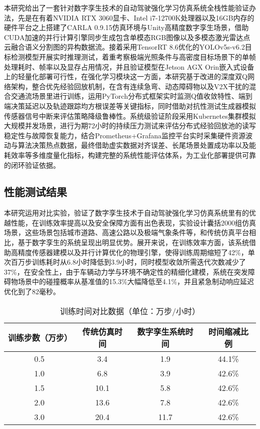 本研究给出了一套针对数字孪生技术的自动驾驶强化学习仿真系统全栈性能验证办法，先是在有着NVIDIA RTX 3060显卡、Intel i7-12700K处理器以及16GB内存的硬件平台之上搭建了CARLA 0.9.15仿真环境与Unity高精度数字孪生场景，借助CUDA加速的并行计算引擎同步生成包含单模态RGB图像以及多模态激光雷达点云融合语义分割图的异构数据流。接着采用TensorRT 8.6优化的YOLOv5s-v6.2目标检测模型开展实时推理测试，着重考察极端光照条件与高密度目标场景下的单帧处理耗时、帧率以及显存占用情况，并且验证模型在Jetson AGX Orin嵌入式设备上的轻量化部署可行性，在强化学习模块这一方面，本研究基于改进的深度双Q网络架构，整合优先经验回放机制，在含有连续急弯、动态障碍物以及V2X干扰的混合交通流场景里进行训练，运用PyTorch分布式框架实时监测Q值收敛特性、端到端决策延迟以及轨迹跟踪均方根误差等关键指标，同时借助对抗性测试生成器模拟传感器信号中断来评估策略降级鲁棒性。系统级验证阶段采用Kubernetes集群模拟大规模并发场景，进行为期72小时的持续压力测试来评估分布式经验回放池的读写稳定性与故障恢复能力，结合Prometheus+Grafana监控平台实时采集硬件资源波动与算法决策热点数据，最终借助虚实数据对齐误差、长尾场景处置成功率以及能耗效率等多维度量化指标，构建完整的系统性能评估体系，为工业化部署提供可靠的闭环验证依据。

\subsection{性能测试结果}

本研究运用对比实验，验证了数字孪生技术于自动驾驶强化学习仿真系统里有的优越性能，在训练效率提高以及安全保障方面有出色表现，实验设计囊括2000组仿真场景，这些场景包括城市道路、高速公路以及极端气象条件等，和传统仿真平台相比，基于数字孪生的系统呈现出明显优势。展开来说，在训练效率方面，该系统借助高精度传感器建模以及并行计算优化的物理引擎，使得训练周期缩短了42\%，单次百万步训练耗时从6.8小时降低到3.9小时，同时模型收敛所需迭代次数减少了37\%，在安全性上，由于车辆动力学与环境不确定性的精细化建模，系统在突发障碍物场景中的碰撞概率从基准值的15.3\%大幅降低至4.1\%，并且紧急制动响应延迟优化到了82毫秒。

\begin{table}[htbp]
	\centering
	\caption{训练时间对比数据（单位：万步/小时）}
	\label{tab:training_time}
	\begin{tabular}{cccc}
		\toprule
		训练步数（万步） & 传统仿真时间 & 数字孪生系统时间 & 时间缩减比例 \\
		\midrule
		0.5 & 3.4 & 1.9 & 44.1\% \\
		1.0 & 6.8 & 3.9 & 42.6\% \\
		1.5 & 10.1 & 5.8 & 42.6\% \\
		2.0 & 13.6 & 7.8 & 42.6\% \\
		3.0 & 20.4 & 11.7 & 42.6\% \\
		\bottomrule
	\end{tabular}
\end{table}

